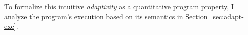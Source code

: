 \begin{enumerate}
To formalize this intuitive \emph{adaptivity} as a quantitative program property, 
I analyze the program's execution based on its semantics
in Section~\ref{sec:adapt-exe}.

\end{enumerate}

